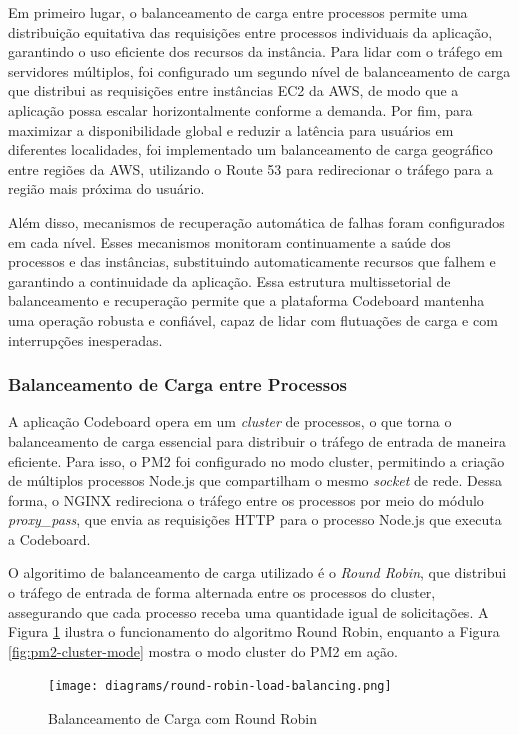 Em primeiro lugar, o balanceamento de carga entre processos permite uma distribuição equitativa das requisições entre processos individuais da aplicação, garantindo o uso eficiente dos recursos da instância. Para lidar com o tráfego em servidores múltiplos, foi configurado um segundo nível de balanceamento de carga que distribui as requisições entre instâncias EC2 da AWS, de modo que a aplicação possa escalar horizontalmente conforme a demanda. Por fim, para maximizar a disponibilidade global e reduzir a latência para usuários em diferentes localidades, foi implementado um balanceamento de carga geográfico entre regiões da AWS, utilizando o Route 53 para redirecionar o tráfego para a região mais próxima do usuário.

Além disso, mecanismos de recuperação automática de falhas foram configurados em cada nível. Esses mecanismos monitoram continuamente a saúde dos processos e das instâncias, substituindo automaticamente recursos que falhem e garantindo a continuidade da aplicação. Essa estrutura multissetorial de balanceamento e recuperação permite que a plataforma Codeboard mantenha uma operação robusta e confiável, capaz de lidar com flutuações de carga e com interrupções inesperadas.

\subsubsection{Balanceamento de Carga entre Processos}

A aplicação Codeboard opera em um \emph{cluster} de processos, o que torna o balanceamento de carga essencial para distribuir o tráfego de entrada de maneira eficiente. Para isso, o PM2 foi configurado no modo cluster, permitindo a criação de múltiplos processos Node.js que compartilham o mesmo \emph{socket} de rede. Dessa forma, o NGINX redireciona o tráfego entre os processos por meio do módulo \emph{proxy\_pass}, que envia as requisições HTTP para o processo Node.js que executa a Codeboard.

O algoritimo de balanceamento de carga utilizado é o \emph{Round Robin}, que distribui o tráfego de entrada de forma alternada entre os processos do cluster, assegurando que cada processo receba uma quantidade igual de solicitações. A Figura \ref{fig:round-robin-load-balancing} ilustra o funcionamento do algoritmo Round Robin, enquanto a Figura \ref{fig:pm2-cluster-mode} mostra o modo cluster do PM2 em ação.

\begin{figure}[H]
    \centering
    \texttt{[image: diagrams/round-robin-load-balancing.png]}
    \caption{Balanceamento de Carga com Round Robin}
    \label{fig:round-robin-load-balancing}
\end{figure} 

